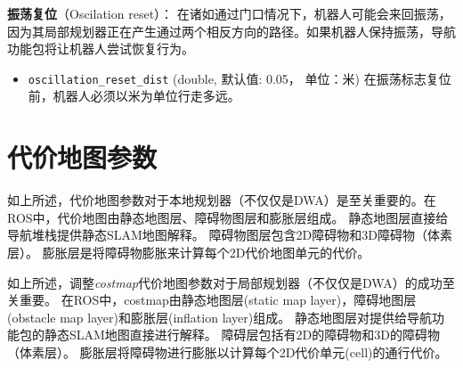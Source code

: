 
\textbf{振荡复位}（Oscilation reset）：
在诸如通过门口情况下，机器人可能会来回振荡，因为其局部规划器正在产生通过两个相反方向的路径。如果机器人保持振荡，导航功能包将让机器人尝试恢复行为。

\begin{itemize}
	\item \texttt{oscillation\_reset\_dist} (double, 默认值: 0.05， 单位：米) 
	在振荡标志复位前，机器人必须以米为单位行走多远。
\end{itemize}



\section[Costmap Parameters]{代价地图参数}

如上所述，代价地图参数对于本地规划器（不仅仅是DWA）是至关重要的。在ROS中，代价地图由静态地图层、障碍物图层和膨胀层组成。
静态地图层直接给导航堆栈提供静态SLAM地图解释。
障碍物图层包含2D障碍物和3D障碍物（体素层）。
膨胀层是将障碍物膨胀来计算每个2D代价地图单元的代价。

如上所述，调整\textit{costmap}代价地图参数对于局部规划器（不仅仅是DWA）的成功至关重要。 
在ROS中，costmap由静态地图层(static map layer)，障碍地图层(obstacle map layer)和膨胀层(inflation layer)组成。 
静态地图层对提供给导航功能包的静态SLAM地图直接进行解释。 
障碍层包括有2D的障碍物和3D的障碍物（体素层）。 
膨胀层将障碍物进行膨胀以计算每个2D代价单元(cell)的通行代价。


